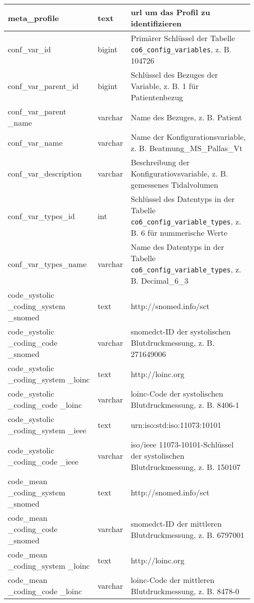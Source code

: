 \begin{longtable}{|p{3.5cm}|l|p{6.5cm}|}
		meta\_profile & text &  \ac{url} um das Profil zu identifizieren \\ \hline
		conf\_var\_id & bigint & Primärer Schlüssel der Tabelle \texttt{co6\_config\_variables}, z. B. 104726 \\ \hline
		conf\_var\_parent\_id & bigint & Schlüssel des Bezuges der Variable, z. B. 1 für Patientenbezug \\ \hline
		conf\_var\_parent \_name & varchar & Name des Bezuges, z. B. Patient \\ \hline
		conf\_var\_name & varchar & Name der Konfigurationsvariable, z. B. Beatmung\_MS\_Pallas\_Vt \\ \hline
		conf\_var\_description & varchar & Beschreibung der Konfiguratiovsvariable, z. B. gemessenes Tidalvolumen \\ \hline
		conf\_var\_types\_id & int & Schlüssel des Datentyps in der Tabelle \texttt{co6\_config\_variable\_types}, z. B. 6 für nummerische Werte \\ \hline
		conf\_var\_types\_name & varchar & Name des Datentyps in der Tabelle \texttt{co6\_config\_variable\_types}, z. B. Decimal\_6\_3 \\ \hline
		code\_systolic \_coding\_system \_snomed & text & http://snomed.info/sct \\ \hline
		code\_systolic \_coding\_code \_snomed & varchar & \ac{snomedct}-ID der systolischen Blutdruckmessung, z. B. 271649006 \\ \hline
		code\_systolic \_coding\_system \_loinc & text & http://loinc.org \\ \hline
		code\_systolic \_coding\_code \_loinc & varchar & \ac{loinc}-Code der systolischen Blutdruckmessung, z. B. 8406-1 \\ \hline
		code\_systolic \_coding\_system \_ieee & text & urn:iso:std:iso:11073:10101 \\ \hline
		code\_systolic \_coding\_code \_ieee & varchar & \ac{iso}/\ac{ieee} 11073-10101\texttrademark{}-Schlüssel der systolischen Blutdruckmessung, z. B. 150107 \\ \hline
		code\_mean \_coding\_system \_snomed & text & http://snomed.info/sct \\ \hline
		code\_mean \_coding\_code \_snomed & varchar & \ac{snomedct}-ID der mittleren Blutdruckmessung, z. B. 6797001 \\ \hline
		code\_mean \_coding\_system \_loinc & text & http://loinc.org \\ \hline
		code\_mean \_coding\_code \_loinc & varchar & \ac{loinc}-Code der mittleren Blutdruckmessung, z. B. 8478-0 \\ \hline

\end{longtable}
